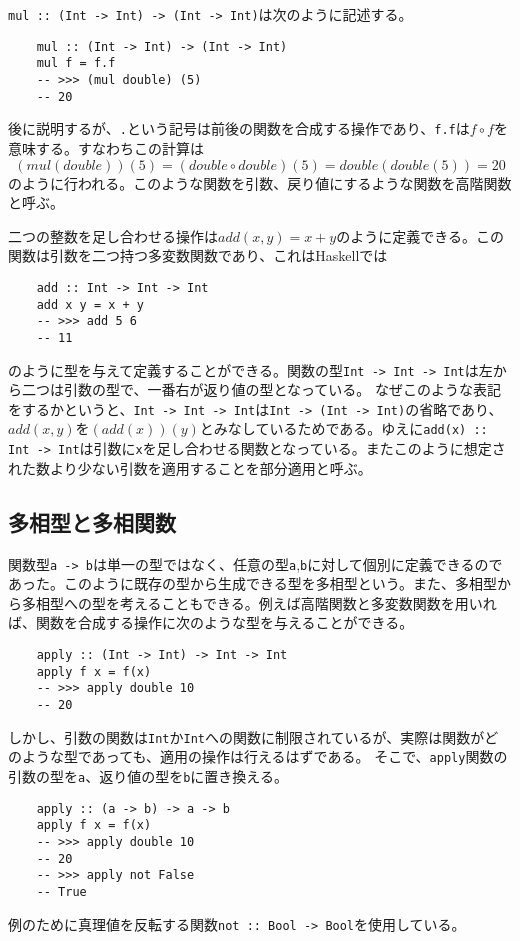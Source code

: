 \documentclass[uplatex,dvipdfmx]{jsarticle}
\newcommand{\pr}[1]{\colorbox[rgb]{0.9,0.9,0.9}{\lstinline{#1}}}
\newcommand{\functype}[2]{\pr{#1 -> #2}}
\newcommand{\fpmor}[3]{\pr{#1 :: #2 -> #3}}
\begin{document}
  \fpmor{mul}{(Int -> Int)}{(Int -> Int)}は次のように記述する。
  \begin{lstlisting}
    mul :: (Int -> Int) -> (Int -> Int)
    mul f = f.f
    -- >>> (mul double) (5)
    -- 20
  \end{lstlisting}
  後に説明するが、\pr{.}という記号は前後の関数を合成する操作であり、\pr{f.f}は$f\circ f$を意味する。すなわちこの計算は
  \[(mul(double))(5)=(double \circ double)(5)=double(double(5))=20\]のように行われる。このような関数を引数、戻り値にするような関数を高階関数と呼ぶ。
  
  二つの整数を足し合わせる操作は$add(x,y)=x+y$のように定義できる。この関数は引数を二つ持つ多変数関数であり、これはHaskellでは
  \begin{lstlisting}
    add :: Int -> Int -> Int
    add x y = x + y
    -- >>> add 5 6
    -- 11
  \end{lstlisting}
  のように型を与えて定義することができる。関数の型\pr{Int -> Int -> Int}は左から二つは引数の型で、一番右が返り値の型となっている。
  なぜこのような表記をするかというと、\pr{Int -> Int -> Int}は\pr{Int -> (Int -> Int)}の省略であり、$add(x,y)$を$(add(x))(y)$とみなしているためである。ゆえに\fpmor{add(x)}{Int}{Int}は引数に\pr{x}を足し合わせる関数となっている。またこのように想定された数より少ない引数を適用することを部分適用と呼ぶ。
  \subsection{多相型と多相関数}
  関数型\functype{a}{b}は単一の型ではなく、任意の型\pr{a},\pr{b}に対して個別に定義できるのであった。このように既存の型から生成できる型を多相型という。また、多相型から多相型への型を考えることもできる。例えば高階関数と多変数関数を用いれば、関数を合成する操作に次のような型を与えることができる。
  \begin{lstlisting}
    apply :: (Int -> Int) -> Int -> Int
    apply f x = f(x)
    -- >>> apply double 10
    -- 20
  \end{lstlisting}
  しかし、引数の関数は\pr{Int}か\pr{Int}への関数に制限されているが、実際は関数がどのような型であっても、適用の操作は行えるはずである。
  そこで、\pr{apply}関数の引数の型を\pr{a}、返り値の型を\pr{b}に置き換える。
    \begin{lstlisting}
    apply :: (a -> b) -> a -> b
    apply f x = f(x)
    -- >>> apply double 10
    -- 20
    -- >>> apply not False
    -- True
  \end{lstlisting}
  例のために真理値を反転する関数\fpmor{not}{Bool}{Bool}を使用している。
\end{document}
